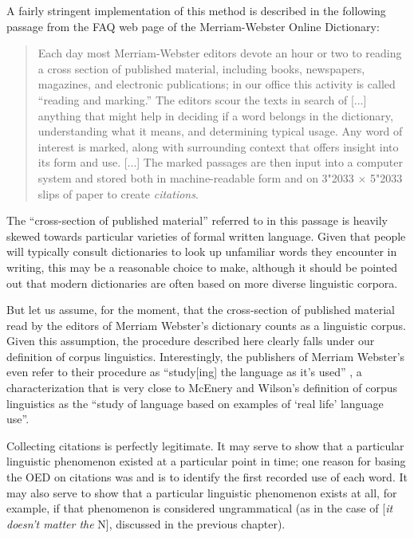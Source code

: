 A fairly stringent implementation of this method is described in the following passage from the FAQ web page of the Merriam-Webster Online Dictionary:

\begin{quotation}
Each day most Merriam-Webster editors devote an hour or two to reading a cross section of published material, including books, newspapers, magazines, and electronic publications; in our office this activity is called ``reading and marking.'' The editors scour the texts in search of [...] anything that might help in deciding if a word belongs in the dictionary, understanding what it means, and determining typical usage. Any word of interest is marked, along with surrounding context that offers insight into its form and use. [...] The marked passages are then input into a computer system and stored both in machine-readable form and on 3\char"2033 $\times$ 5\char"2033  slips of paper to create \emph{citations}. \citep{merriam-webster_how_2014}
\end{quotation}

The ``cross-section of published material'' referred to in this passage is heavily skewed towards particular varieties of formal written language. Given that people will typically consult dictionaries to look up unfamiliar words they encounter in writing, this may be a reasonable choice to make, although it should be pointed out that modern dictionaries are often based on more diverse linguistic corpora.

But let us assume, for the moment, that the cross-section of published material read by the editors of Merriam Webster's dictionary counts as a linguistic corpus. Given this assumption, the procedure described here clearly falls under our definition of corpus linguistics. Interestingly, the publishers of Merriam Webster's even refer to their procedure as ``study[ing] the language as it's used'' \citep{merriam-webster_how_2014}, a characterization that is very close to McEnery and Wilson's definition of corpus linguistics as the ``study of language based on examples of `real life' language use''.

Collecting citations is perfectly legitimate. It may serve to show that a particular linguistic phenomenon existed at a particular point in time; one reason for basing the OED on citations was and is to identify the first recorded use of each word. It may also serve to show that a particular linguistic phenomenon exists at all, for example, if that phenomenon is considered ungrammatical (as in the case of [\textit{it doesn't matter the} N], discussed in the previous chapter).

